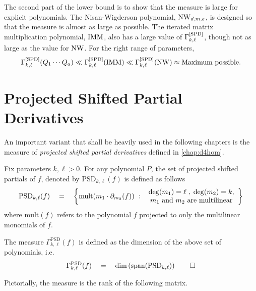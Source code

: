 The second part of the lower bound is to show that the measure is large for explicit polynomials. The Nisan-Wigderson polynomial, $\operatorname{\mathrm{NW}}_{d,m,e}$, is designed so that the measure is almost as large as possible. The iterated matrix multiplication polynomial, $\operatorname{\mathrm{IMM}}$, also has a large value of $\Gamma^{\mathrm{[SPD]}}_{k,\ell}$, though not as large as the value for $\operatorname{\mathrm{NW}}$. For the right range of parameters, 
\[
\Gamma^{\mathrm{[SPD]}}_{k,\ell}(Q_1\cdots Q_a) \ll \Gamma^{\mathrm{[SPD]}}_{k,\ell}(\operatorname{\mathrm{IMM}}) \ll \Gamma^{\mathrm{[SPD]}}_{k,\ell}(\operatorname{\mathrm{NW}}) \approx \text{Maximum possible}.
\]

\section{Projected Shifted Partial Derivatives}

An important variant that shall be heavily used in the following chapters is the measure of \emph{projected shifted partial derivatives} defined in \autoref{chap:d4hom}. 

\begin{definition*}
Fix parameters $k,\ell > 0$. 
For any polynomial $P$, the set of projected shifted partials of $f$, denoted by $\mathrm{PSD}_{k,\ell}(f)$ is defined as follows
\[
\mathrm{PSD}_{k,\ell}(f) \quad = \quad \left\{{\mathrm{mult}(m_1 \cdot \partial_{m_2}(f))}\ : \ {\begin{array}{c}\deg(m_1) = \ell\;,\; \deg(m_2) = k,\\ \text{$m_1$ and $m_2$ are multilinear}\end{array}}\right\}
\]
where $\mathrm{mult}(f)$ refers to the polynomial $f$ projected to only the multilinear monomials of $f$. 

The measure $\Gamma^{\mathrm{PSD}}_{k,\ell}(f)$ is defined as the dimension of the above set of polynomials, i.e.
\[\Gamma^{\mathrm{PSD}}_{k,\ell}(f) \quad = \quad \dim\left(\mathrm{span}(\mathrm{PSD}_{k,\ell})\right)\qedhere\]
\end{definition*}

Pictorially, the measure is the rank of the following matrix. 


